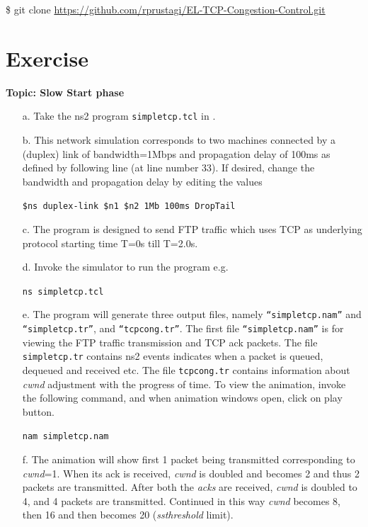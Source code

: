 \begin{multicols}{2}
 \$ git clone \url{https://github.com/rprustagi/EL-TCP-Congestion-Control.git}

\setcounter{section}{0}
\section{Exercise}\label{chap2-exe01}

\textbf{Topic: Slow Start phase}

\begin{itemize}

\item[a.] Take the ns2 program \texttt{simpletcp.tcl} in \cite{art2-key12}.

\item[b.] This network simulation corresponds to two machines connected by a (duplex) link of bandwidth=1Mbps and propagation delay of 100ms as defined by following line (at line number 33). If desired, change the bandwidth and propagation delay by editing the values 

\texttt{\$ns duplex-link \$n1 \$n2 1Mb 100ms DropTail}

\item[c.] The program is designed to send FTP traffic which uses TCP as underlying protocol starting time T=0s till T=2.0s.

\item[d.] Invoke the simulator to run the program e.g.

\texttt{ns simpletcp.tcl}

\item[e.] The program will generate three output files, namely \texttt{“simpletcp.nam”} and \texttt{“simpletcp.tr”}, and \texttt{“tcpcong.tr”}. The first file \texttt{“simpletcp.nam”} is for viewing the FTP traffic transmission and TCP ack packets. The file \texttt{simpletcp.tr} contains ns2 events indicates when a packet is queued, dequeued and received etc. The file \texttt{tcpcong.tr} contains information about \textit{cwnd} adjustment with the progress of time. To view the animation, invoke the following command, and when animation windows open, click on play button.

\texttt{nam simpletcp.nam}

\item[f.] The animation will show first 1 packet being transmitted corresponding to \textit{cwnd}=1. When its ack is received, \textit{cwnd} is doubled and becomes 2 and thus 2 packets are transmitted. After both the \textit{acks} are received, \textit{cwnd} is doubled to 4, and 4 packets are transmitted. Continued in this way \textit{cwnd} becomes 8, then 16 and then becomes 20 (\textit{ssthreshold} limit).


\end{itemize}
\end{multicols}
